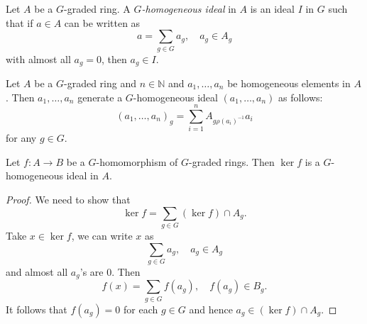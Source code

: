 \begin{definition}
    Let $A$ be a $G$-graded ring. A \emph{$G$-homogeneous ideal} in $A$ is an ideal $I$ in $G$ such that if $a\in A$ can be written as 
    \[
        a=\sum_{g\in G} a_g,\quad a_g\in A_g  
    \]
    with almost all $a_g=0$, then $a_g\in I$.
\end{definition}
\begin{example}\label{ex-homogeneousidealgeneratedbyelements}
    Let $A$ be a $G$-graded ring and $n\in \mathbb{N}$ and $a_1,\ldots,a_n$ be homogeneous elements in $A$. Then $a_1,\ldots,a_n$ generate a $G$-homogeneous ideal $(a_1,\ldots,a_n)$ as follows:
    \[
        (a_1,\ldots,a_n)_g=\sum_{i=1}^n A_{g \rho(a_i)^{-1}}a_i
    \]
    for any $g\in G$.
\end{example}





\begin{lemma}\label{lma-kernelghomogeneous}
    Let $f:A\rightarrow B$ be a $G$-homomorphism of $G$-graded rings. Then $\ker f$ is a $G$-homogeneous ideal in $A$.
\end{lemma}
\begin{proof}
    We need to show that
    \[
        \ker f=\sum_{g\in G} (\ker f)\cap A_g.  
    \]
    Take $x\in \ker f$, we can write $x$ as 
    \[
        \sum_{g\in G} a_g,\quad a_g\in A_g
    \]
    and almost all $a_g$'s are $0$. Then 
    \[
        f(x)=  \sum_{g\in G} f(a_g),\quad f(a_g)\in B_g.
    \]
    It follows that $f(a_g)=0$ for each $g\in G$ and hence $a_g\in (\ker f)\cap A_g$.
\end{proof}

